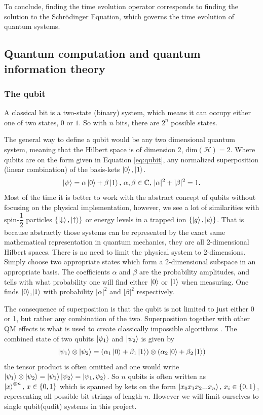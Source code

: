 To conclude, finding the time evolution operator corresponds to finding the solution to the Schrödinger Equation, which governs the time evolution of quantum systems.

\subsection{Quantum computation and quantum information theory}
\subsubsection{The qubit}
A classical bit is a two-state (binary) system, which means it can occupy either one of two states, $0$ or $1$. So with $n$ bits, there are $2^n$ possible states.

The general way to define a qubit would be any two dimensional quantum system, meaning that the Hilbert space is of dimension 2, $\text{dim}(\mathcal{H}) = 2$. Where qubits are on the form given in Equation \ref{eq:qubit}, any normalized superposition (linear combination) of the basis-kets $\ket{0},\ket{1}$.
\begin{equation}
\label{eq:qubit}
\ket{\psi} = \alpha\ket{0} + \beta\ket{1},\,\alpha,\beta \in \mathbb{C},\, |\alpha|^2 + |\beta|^2 = 1.
\end{equation}
Most of the time it is better to work with the abstract concept of qubits without focusing on the physical implementation, however, we see a lot of similarities with spin-$\dfrac{1}{2}$ particles $\{\ket{\downarrow},\ket{\uparrow}\}$ or energy levels in a trapped ion $\{\ket{g},\ket{e}\}$. That is because abstractly those systems can be represented by the exact same mathematical representation in quantum mechanics, they are all 2-dimensional Hilbert spaces. There is no need to limit the physical system to 2-dimensions. Simply choose two appropriate states which form a 2-dimensional subspace in an appropriate basis. The coefficients $\alpha$ and $\beta$ are the probability amplitudes, and tells with what probability one will find either $\ket{0}$ or $\ket{1}$ when measuring. One finds $\ket{0}$,$\ket{1}$ with probability $|\alpha|^2$ and $|\beta|^2$ respectively.

The consequence of superposition is that the qubit is not limited to just either 0 or 1, but rather any combination of the two. Superposition together with other QM effects is what is used to create classically impossible algorithms \cite{shor,Grover}. The combined state of two qubits $\ket{\psi_1}$ and $\ket{\psi_2}$ is given by 
\begin{equation}
\ket{\psi_1} \otimes \ket{\psi_2} = (\alpha_1\ket{0} + \beta_1\ket{1})\otimes(\alpha_2\ket{0} + \beta_2\ket{1})
\end{equation}
the tensor product is often omitted and one would write $\ket{\psi_1} \otimes \ket{\psi_2} = \ket{\psi_1}\ket{\psi_2} = \ket{\psi_1, \psi_2}$.
So $n$ qubits is often written as $\ket{x}^{\otimes n},\, x \in \{0,1\}$ which is spanned by kets on the form $\ket{x_0x_1x_2...x_n},\, x_i \in \{0,1\}$, representing all possible bit strings of length $n$. However we will limit ourselves to single qubit(qudit) systems in this project.

